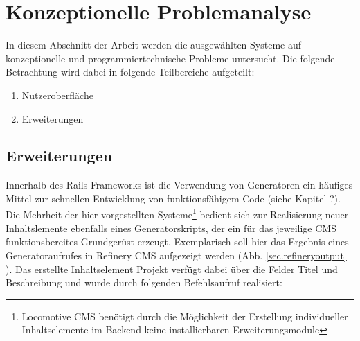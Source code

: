 \chapter{Konzeptionelle Problemanalyse}

In diesem Abschnitt der Arbeit werden die ausgewählten Systeme auf konzeptionelle und programmiertechnische Probleme untersucht. Die folgende Betrachtung wird dabei in folgende Teilbereiche aufgeteilt:

\begin{enumerate}
\item Nutzeroberfläche
\item Erweiterungen
\end{enumerate}


\section{Erweiterungen}
\label{dryverstoss}
Innerhalb des Rails Frameworks ist die Verwendung von Generatoren ein häufiges Mittel zur schnellen Entwicklung von funktionsfähigem Code (siehe Kapitel ?). Die Mehrheit der hier vorgestellten Systeme\footnote{Locomotive CMS benötigt durch die Möglichkeit der Erstellung individueller Inhaltselemente im Backend keine installierbaren Erweiterungsmodule} bedient sich zur Realisierung neuer Inhaltslemente ebenfalls eines Generatorskripts, der ein für das jeweilige CMS funktionsbereites Grundgerüst erzeugt. Exemplarisch soll hier das Ergebnis eines Generatoraufrufes in Refinery CMS aufgezeigt werden (Abb. \ref{sec.refineryoutput} ). Das erstellte Inhaltselement Projekt verfügt dabei über die Felder Titel und Beschreibung und wurde durch folgenden Befehlsaufruf realisiert:






